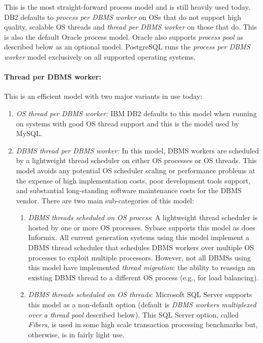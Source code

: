 \documentclass[b5paper,11pt,twoside,openright]{book}
\begin{document}
This is the most straight-forward process model and is still heavily
used today. DB2 defaults to \emph{process per DBMS worker} on OSs that
do not support high quality, scalable OS threads and \emph{thread per
DBMS worker} on those that do. This is also the default Oracle process
model. Oracle also supports \emph{process pool} as described below as an
optional model. PostgreSQL runs the \emph{process per DBMS worker} model
exclusively on all supported operating systems.

\paragraph{Thread per DBMS worker:} This is an efficient model with two
major variants in use today:

\begin{enumerate}
\def\labelenumi{\arabic{enumi}.}
\item
  \emph{OS thread per DBMS worker:} IBM DB2 defaults to this model when
  running on systems with good OS thread support and this is the model
  used by MySQL.
\item
  \emph{DBMS thread per DBMS worker:} In this model, DBMS workers are
  scheduled by a lightweight thread scheduler on either OS processes or
  OS threads. This model avoids any potential OS scheduler scaling or
  performance problems at the expense of high implementation costs, poor
  development tools support, and substantial long-standing software
  maintenance costs for the DBMS vendor. There are two main
  sub-categories of this model:

\begin{enumerate}
\def\labelenumi{\alph{enumi}.}

	\item
	\emph{DBMS} \emph{threads scheduled on OS process}:
A lightweight thread scheduler is hosted by one or more OS processes.
Sybase supports this model as does Informix. All current generation
systems using this model implement a DBMS thread scheduler that
schedules DBMS workers over multiple OS processes to exploit multiple
processors. However, not all DBMSs using this model have implemented
\emph{thread migration}: the ability to reassign an existing DBMS thread
to a different OS process (e.g., for load balancing).

\item
  \emph{DBMS threads scheduled on OS threads}: Microsoft SQL Server
  supports this model as a non-default option (default is \emph{DBMS
  workers multiplexed over} \emph{a thread pool} described below). This
  SQL Server option, called \emph{Fibers}, is used in some high scale
  transaction processing benchmarks but, otherwise, is in fairly light
  use.
\end{enumerate}
\end{enumerate}
\end{document}
